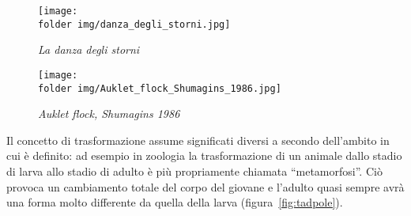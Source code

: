 \begin{figure*}[!htb]
\begin{center}
  \noindent\begin{minipage}{0.485\textwidth}
    \centering
    \texttt{[image: \\folder img/danza\_degli\_storni.jpg]}
    \caption{\emph{La danza degli storni}
      \protect\footnotemark}\label{fig:storni1}
  \end{minipage}
  \hspace{2mm}  
  \noindent\begin{minipage}{0.47\textwidth}
    \centering
    
\texttt{[image: \\folder img/Auklet\_flock\_Shumagins\_1986.jpg]}
    \caption{\emph{Auklet flock, Shumagins 1986}\protect\footnotemark
            }\label{fig:storni2}
  \end{minipage}
\end{center}
\end{figure*}


%
%    
%    

Il concetto di trasformazione assume significati diversi a secondo 
dell'ambito in cui è definito: ad esempio in zoologia la 
trasformazione di un animale dallo stadio di larva allo stadio di 
adulto è più propriamente chiamata ``metamorfosi''. Ciò provoca un 
cambiamento totale del corpo del giovane e l'adulto quasi sempre avrà 
una forma molto differente da quella della larva 
(figura~\ref{fig:tadpole}).

